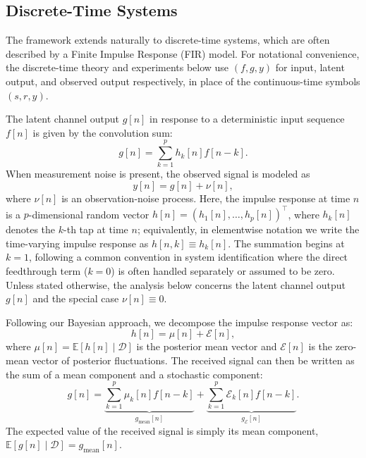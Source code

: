 \documentclass[preprint,1p,times,authoryear]{elsarticle}
\begin{document}
\subsection{Discrete-Time Systems}

The framework extends naturally to discrete-time systems, which are often described by a Finite Impulse Response (FIR) model. For notational convenience, the discrete-time theory and experiments below use $(f,g,y)$ for input, latent output, and observed output respectively, in place of the continuous-time symbols $(s,r,y)$. 

The latent channel output $g[n]$ in response to a deterministic input sequence $f[n]$ is given by the convolution sum:
\begin{equation}
g[n] = \sum_{k=1}^{p} h_k[n] f[n - k].
\end{equation}
When measurement noise is present, the observed signal is modeled as
\begin{equation}
y[n] = g[n] + \nu[n],
\end{equation}
where $\nu[n]$ is an observation-noise process. Here, the impulse response at time $n$ is a $p$-dimensional random vector $h[n]=(h_1[n], \ldots, h_p[n])^\top$, where $h_k[n]$ denotes the $k$-th tap at time $n$; equivalently, in elementwise notation we write the time-varying impulse response as $h[n,k] \equiv h_k[n]$. The summation begins at $k=1$, following a common convention in system identification where the direct feedthrough term ($k=0$) is often handled separately or assumed to be zero. Unless stated otherwise, the analysis below concerns the latent channel output $g[n]$ and the special case $\nu[n]\equiv 0$.

Following our Bayesian approach, we decompose the impulse response vector as:
\begin{equation}
h[n] = \mu[n] + \mathcal{E}[n],
\end{equation}
where $\mu[n] = \mathbb{E}[h[n]\mid\mathcal{D}]$ is the posterior mean vector and $\mathcal{E}[n]$ is the zero-mean vector of posterior fluctuations. The received signal can then be written as the sum of a mean component and a stochastic component:
\begin{equation}
g[n] = \underbrace{\sum_{k=1}^{p} \mu_k[n] f[n - k]}_{g_{\text{mean}}[n]} + \underbrace{\sum_{k=1}^{p} \mathcal{E}_k[n] f[n - k]}_{g_{\mathcal{E}}[n]}.
\end{equation}
The expected value of the received signal is simply its mean component, $\mathbb{E}[ g[n] \mid \mathcal{D} ] = g_{\text{mean}}[n]$.
\end{document}
